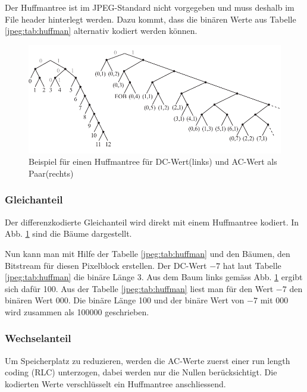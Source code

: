 Der Huffmantree ist im JPEG-Standard nicht vorgegeben und muss deshalb im File header hinterlegt werden.
Dazu kommt, dass die binären Werte aus Tabelle \ref{jpeg:tab:huffman} alternativ kodiert werden können.

\begin{figure}[t]
    \centering
    \includegraphics[width=\textwidth]{papers/jpeg/pictures/huffman.pdf}
    \caption{Beispiel für einen Huffmantree für DC-Wert(links)\cite{jpeg:dccomponentyoutube} und AC-Wert als Paar(rechts)\cite{jpeg:accomponentsyoutube}
        \label{jpeg:fig:huffman}}
\end{figure}

\subsubsection{Gleichanteil
\label{jpeg:subsubsection:gleichanteil}}
Der differenzkodierte Gleichanteil wird direkt mit einem Huffmantree kodiert.
In Abb. \ref{jpeg:fig:huffman} sind die Bäume dargestellt.

Nun kann man mit Hilfe der Tabelle \ref{jpeg:tab:huffman} und den Bäumen, den Bitstream für diesen Pixelblock erstellen.
Der DC-Wert \(-7\) hat laut Tabelle \ref{jpeg:tab:huffman} die binäre Länge 3.
Aus dem Baum links gemäss Abb. \ref{jpeg:fig:huffman} ergibt sich dafür 100.
Aus der Tabelle \ref{jpeg:tab:huffman} liest man für den Wert \(-7\) den binären Wert 000.
Die binäre Länge 100 und der binäre Wert von \(-7\) mit 000 wird zusammen als 100000 geschrieben.

\subsubsection{Wechselanteil
\label{jpeg:subsubsection:wechselanteil}}
Um Speicherplatz zu reduzieren, werden die AC-Werte zuerst einer run length coding (RLC) unterzogen, dabei werden nur die Nullen berücksichtigt. 
Die kodierten Werte verschlüsselt ein Huffmantree anschliessend.

